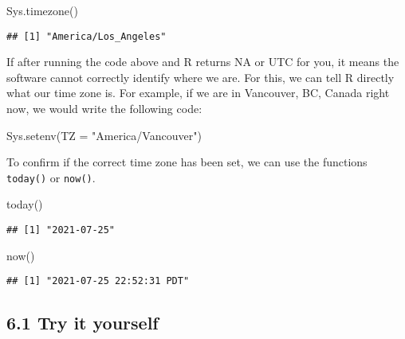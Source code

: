 \documentclass[
]{book}
\newenvironment{Shaded}{\begin{snugshade}}{\end{snugshade}}
\newcommand{\AttributeTok}[1]{\textcolor[rgb]{0.77,0.63,0.00}{#1}}
\newcommand{\FunctionTok}[1]{\textcolor[rgb]{0.00,0.00,0.00}{#1}}
\newcommand{\NormalTok}[1]{#1}
\newcommand{\StringTok}[1]{\textcolor[rgb]{0.31,0.60,0.02}{#1}}
\begin{document}
\begin{Shaded}
\begin{Highlighting}[]
\FunctionTok{Sys.timezone}\NormalTok{()}
\end{Highlighting}
\end{Shaded}

\begin{verbatim}
## [1] "America/Los_Angeles"
\end{verbatim}

If after running the code above and R returns NA or UTC for you, it means the software cannot correctly identify where we are. For this, we can tell R directly what our time zone is. For example, if we are in Vancouver, BC, Canada right now, we would write the following code:

\begin{Shaded}
\begin{Highlighting}[]
\FunctionTok{Sys.setenv}\NormalTok{(}\AttributeTok{TZ =} \StringTok{"America/Vancouver"}\NormalTok{)}
\end{Highlighting}
\end{Shaded}

To confirm if the correct time zone has been set, we can use the functions \texttt{today()} or \texttt{now()}.

\begin{Shaded}
\begin{Highlighting}[]
\FunctionTok{today}\NormalTok{()}
\end{Highlighting}
\end{Shaded}

\begin{verbatim}
## [1] "2021-07-25"
\end{verbatim}

\begin{Shaded}
\begin{Highlighting}[]
\FunctionTok{now}\NormalTok{()}
\end{Highlighting}
\end{Shaded}

\begin{verbatim}
## [1] "2021-07-25 22:52:31 PDT"
\end{verbatim}

\hypertarget{try-it-yourself-28}{%
\subsection{6.1 Try it yourself}\label{try-it-yourself-28}}
\end{document}
